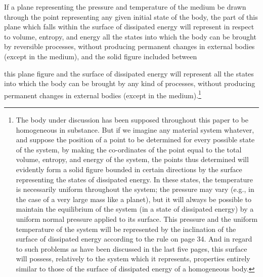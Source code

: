 \documentclass[11pt]{article}
\begin{document}
If a plane representing the pressure and temperature of the medium be drawn through the point representing any given initial state of the body, the part of this plane which falls within the surface of dissipated energy will represent in respect to volume, entropy, and energy all the states into which the body can be brought by reversible processes, without producing permanent changes in external bodies (except in the medium), and the solid figure included between

this plane figure and the surface of dissipated energy will represent all the states into which the body can be brought by any kind of processes, without producing permanent changes in external bodies (except in the medium).\footnote{The body under discussion has been supposed throughout this paper to be homogeneous in substance. But if we imagine any material system whatever, and suppose the position of a point to be determined for every possible state of the system, by making the co-ordinates of the point equal to the total volume, entropy, and energy of the system, the points thus determined will evidently form a solid figure bounded in certain directions by the surface representing the states of dissipated energy. In these states, the temperature is necessarily uniform throughout the system; the pressure may vary (e.g., in the case of a very large mass like a planet), but it will always be possible to maintain the equilibrium of the system (in a state of dissipated energy) by a uniform normal pressure applied to its surface. This pressure and the uniform temperature of the system will be represented by the inclination of the surface of dissipated energy according to the rule on page 34. And in regard to such problems as have been discussed in the last five pages, this surface will possess, relatively to the system which it represents, properties entirely similar to those of the surface of dissipated energy of a homogeneous body.}
\end{document}
